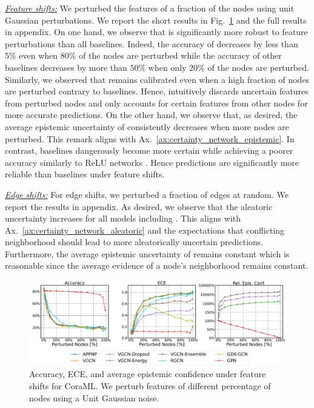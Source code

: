 \textit{\underline{Feature shifts:}} We perturbed the features of a fraction of the nodes using unit Gaussian perturbations. We report the short results in Fig.~\ref{fig:shifts-normal-cora} and the full results in appendix. On one hand, we observe that \GPNacro{} is significantly more robust to feature perturbations than all baselines. Indeed, the accuracy of \GPNacro{} decreases by less than $5\%$ even when $80\%$ of the nodes are perturbed while the accuracy of other baselines decreases by more than $50\%$ when only $20\%$ of the nodes are perturbed. Similarly, we observed that \GPNacro{} remains calibrated even when a high fraction of nodes are perturbed contrary to baselines. Hence, \GPNacro{} intuitively discards uncertain features from perturbed nodes and only accounts for certain features from other nodes for more accurate predictions. On the other hand, we observe that, as desired, the average epistemic uncertainty of \GPNacro{} consistently decreases when more nodes are perturbed. This remark aligns with Ax.~\ref{ax:certainty_network_epistemic}. In contrast, baselines dangerously become more certain while achieving a poorer accuracy similarly to ReLU networks \citep{overconfident-relu}. Hence \GPNacro{} predictions are significantly more reliable than baselines under feature shifts. 


\textit{\underline{Edge shifts:}} For edge shifts, we perturbed a fraction of edges at random. We report the results in appendix. As desired, we observe that the aleatoric uncertainty increases for all models including \GPNacro{}. This aligns with Ax.~\ref{ax:certainty_network_aleatoric} and the expectations that conflicting neighborhood should lead to more aleatorically uncertain predictions. Furthermore, the average epistemic uncertainty of \GPNacro{} remains constant which is reasonable since the average evidence of a node's neighborhood remains constant.

%
\begin{figure}[!h]
    \centering
    \includegraphics[width=\textwidth]{sections/009_neurips2021/resources/CoraML-normal-shift.pdf}
    \caption{Accuracy, ECE, and average epistemic confidence under feature shifts for CoraML. We perturb features of different percentage of nodes using a Unit Gaussian noise.}
    \label{fig:shifts-normal-cora}
\end{figure}
%

